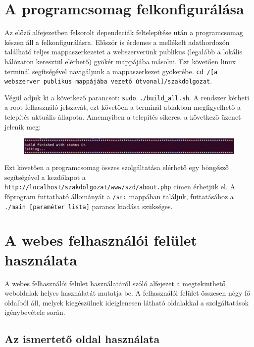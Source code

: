 \documentclass[oneside,titlepage,12pt,a4paper]{report}
\begin{document}
\section{A programcsomag felkonfigurálása}

Az előző alfejezetben felsorolt dependeciák feltelepítése után a programcsomag készen áll a felkonfigurálásra. Először is érdemes a mellékelt adathordozón található teljes mappaszerkezetet a webszerverünk publikus (legalább a lokális hálózaton keresztül elérhető) gyökér mappájába másolni. Ezt követően linux terminál segítségével navigáljunk a mappaszerkezet gyökerébe. \texttt{cd /[a webszerver publikus mappájába vezető útvonal]/szakdolgozat}. \par Végül adjuk ki a következő parancsot: \texttt{sudo ./build\_all.sh}. A rendszer kérheti a root felhasználó jelszavát, ezt követően a terminál ablakban megfigyelhető a telepítés aktuális állapota. Amennyiben a telepítés sikeres, a következő üzenet jelenik meg:

\begin{figure}[H]
\begin{center}
   \includegraphics[width=150mm]{./Abrak/WWW/buildDone.jpg}
\end{center}
\end{figure}

Ezt követően a programcsomag összes szolgáltatása elérhető egy böngésző segítségével a kezdőlapot a \texttt{http://localhost/szakdolgozat/www/szd/about.php} címen érhetjük el. A főprogram futtatható állományát a \texttt{/src} mappában találjuk, futtatásához a \texttt{./main [paraméter lista]} parancs kiadása szükséges. 

\section{A webes felhasználói felület használata}

A webes felhasználói felület használatáról szóló alfejezet a megtekinthető weboldalak helyes használatát mutatja be. A felhasználói felület összesen négy fő oldalból áll, melyek kiegészülnek ideiglenesen látható oldalakkal a szolgáltatások igénybevétele során. 

\subsection*{Az ismertető oldal használata}
\end{document}
